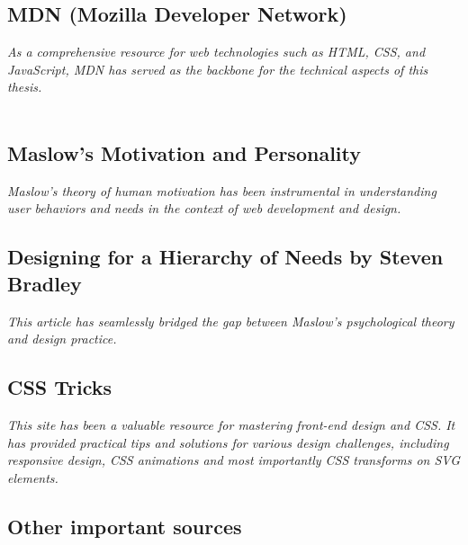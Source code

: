\subsection*{MDN (Mozilla Developer Network)}
\textit{As a comprehensive resource for web technologies such as HTML, CSS, and JavaScript, MDN has served as the backbone for the technical aspects of this thesis.}\\
\\

\subsection*{Maslow's Motivation and Personality}
\textit{Maslow's theory of human motivation has been instrumental in understanding user behaviors and needs in the context of web development and design.}\\

\subsection*{Designing for a Hierarchy of Needs by Steven Bradley}
\textit{This article has seamlessly bridged the gap between Maslow's psychological theory and design practice.}\\

\subsection*{CSS Tricks}
\textit{This site has been a valuable resource for mastering front-end design and CSS.
It has provided practical tips and solutions for various design challenges, including responsive design, CSS animations and most importantly CSS transforms on SVG elements.}\\

\subsection*{Other important sources}
\\
\\
\\
\\

